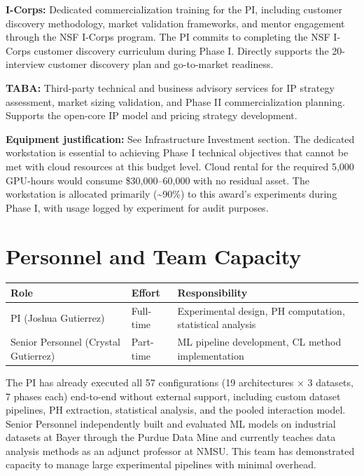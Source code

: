 \documentclass[11pt,letterpaper]{article}
\begin{document}
\textbf{I-Corps:} Dedicated commercialization training for the PI, including customer discovery methodology, market validation frameworks, and mentor engagement through the NSF I-Corps program. The PI commits to completing the NSF I-Corps customer discovery curriculum during Phase I. Directly supports the 20-interview customer discovery plan and go-to-market readiness.

\textbf{TABA:} Third-party technical and business advisory services for IP strategy assessment, market sizing validation, and Phase II commercialization planning. Supports the open-core IP model and pricing strategy development.

\textbf{Equipment justification:} See Infrastructure Investment section. The dedicated workstation is essential to achieving Phase I technical objectives that cannot be met with cloud resources at this budget level. Cloud rental for the required 5,000 GPU-hours would consume \$30,000--60,000 with no residual asset. The workstation is allocated primarily (\textasciitilde90\%) to this award's experiments during Phase I, with usage logged by experiment for audit purposes.

\section{Personnel and Team Capacity}

\begin{center}
\begin{tabular}{@{}lll@{}}
\toprule
\textbf{Role} & \textbf{Effort} & \textbf{Responsibility} \\
\midrule
PI (Joshua Gutierrez) & Full-time & Experimental design, PH computation, statistical analysis \\
Senior Personnel (Crystal Gutierrez) & Part-time & ML pipeline development, CL method implementation \\
\bottomrule
\end{tabular}
\end{center}

The PI has already executed all 57 configurations (19 architectures $\times$ 3 datasets, 7 phases each) end-to-end without external support, including custom dataset pipelines, PH extraction, statistical analysis, and the pooled interaction model. Senior Personnel independently built and evaluated ML models on industrial datasets at Bayer through the Purdue Data Mine and currently teaches data analysis methods as an adjunct professor at NMSU. This team has demonstrated capacity to manage large experimental pipelines with minimal overhead.
\end{document}
